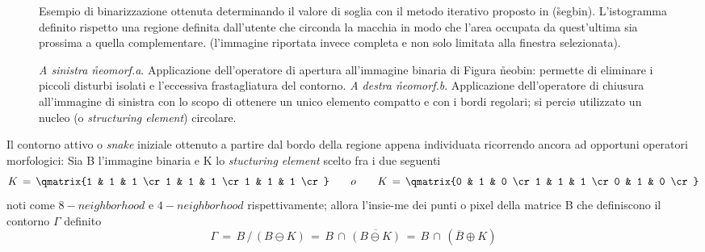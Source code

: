\begin{figure}[tbp]
 \centerline{
  }
 \caption[Esempio di binarizzazione]
  {Esempio di binarizzazione ottenuta determinando il valore di soglia con il metodo
   iterativo proposto in (\r{segbin}). L'istogramma \e definito rispetto una regione
   definita dall'utente che circonda la macchia in modo che l'area occupata da quest'ultima
   sia prossima a quella complementare. (l'immagine riportata
   \e invece completa e non solo limitata alla finestra selezionata).}
 \centerline{
   \hfill
  }
   \caption[Esempio di applicazione di operatori morfologici]
    {{\sl A sinistra \r{neomorf}.a}. Applicazione dell'operatore di apertura all'immagine binaria di
     Figura \r{neobin}: permette di eliminare i piccoli disturbi isolati e l'eccessiva 
     frastagliatura del contorno.
     {\sl A destra \r{neomorf}.b}. Applicazione dell'operatore di chiusura all'immagine di sinistra con lo
     scopo di ottenere un unico elemento compatto e con i bordi regolari; si \e perci\o
     utilizzato un nucleo (o {\it structuring element}) circolare.}
\end{figure}

Il contorno attivo o {\it snake} iniziale \e ottenuto a partire dal bordo della regione appena
individuata ricorrendo ancora ad opportuni operatori morfologici:
\bdf
Sia B l'immagine binaria e K lo {\it stucturing element} scelto fra i due seguenti
$$
K\,=\,\qmatrix{1 & 1 & 1 \cr
               1 & 1 & 1 \cr
               1 & 1 & 1 \cr} \qquad o \qquad
K\,=\,\qmatrix{0 & 1 & 0 \cr
               1 & 1 & 1 \cr
               0 & 1 & 0 \cr}
$$
noti come $8-neighborhood$ e $4-neighborhood$ rispettivamente; allora l'insie-me dei punti
o pixel della matrice B che definiscono il contorno $\Gamma$ \e definito
$$
\Gamma\,=\,B\,/\,(B \ominus K)\,=\,B\,\cap\,\overline{(B \ominus K)}\,=\,
B\,\cap\,(\overline{B} \oplus K)
$$
\edf

